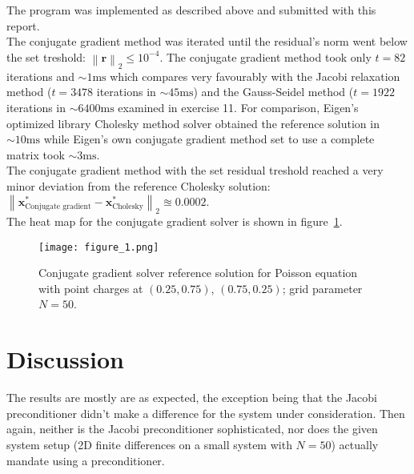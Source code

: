 \documentclass[11pt,a4paper]{article}
\renewcommand{\vec}[1]{\mathbf{#1}}
\newcommand{\norm}[1]{\left\lVert#1\right\rVert}
\begin{document}
The program was implemented as described above and submitted with this report. \\
The conjugate gradient method was iterated until the residual's norm went below the set treshold: $\norm{\vec{r}}_{2} \le 10^{-4}$.
The conjugate gradient method took only $t=82$ iterations and $\sim 1 \text{ms}$ which compares very favourably with the Jacobi relaxation method ($t=3478$ iterations in $\sim 45 \text{ms}$)
and the Gauss-Seidel method ($t=1922$ iterations in $\sim 6400 \text{ms}$ examined in exercise 11. For comparison, Eigen's optimized library Cholesky method
solver obtained the reference solution in $\sim 10 \text{ms}$ while Eigen's own conjugate gradient method set to use a complete matrix took $\sim 3 \text{ms}$.\\
The conjugate gradient method with the set residual treshold reached a very minor deviation from the reference Cholesky solution:\\ 
$\norm{\vec{x}^*_{\text{Conjugate gradient}} - \vec{x}^*_{\text{Cholesky}}}_{2} \approxeq 0.0002$. \\
The heat map for the conjugate gradient solver is shown in figure~\ref{fig:1}.


\begin{figure}[ht]
\begin{center}
\texttt{[image: figure\_1.png]} 
\end{center}
\caption{Conjugate gradient solver reference solution for Poisson equation with point charges at $(0.25, 0.75)$, $(0.75, 0.25)$; grid parameter $N=50$.}
\label{fig:1}
\end{figure}

\section{Discussion}
The results are mostly are as expected, the exception being that the Jacobi preconditioner didn't make a difference for the system under consideration.
Then again, neither is the Jacobi preconditioner sophisticated, nor does the given system setup (2D finite differences on a small system with $N=50$) actually
mandate using a preconditioner.
\end{document}
